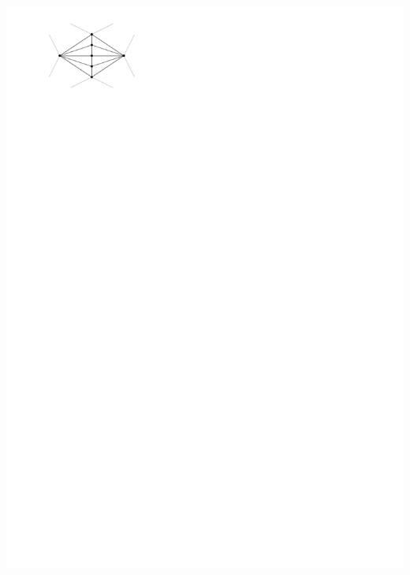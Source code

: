 \documentclass[a4paper]{article}
\begin{document}
\includegraphics[width =\textwidth]{./introduction/img/nest4cycle.pdf}
\clearpage%
\end{document}
